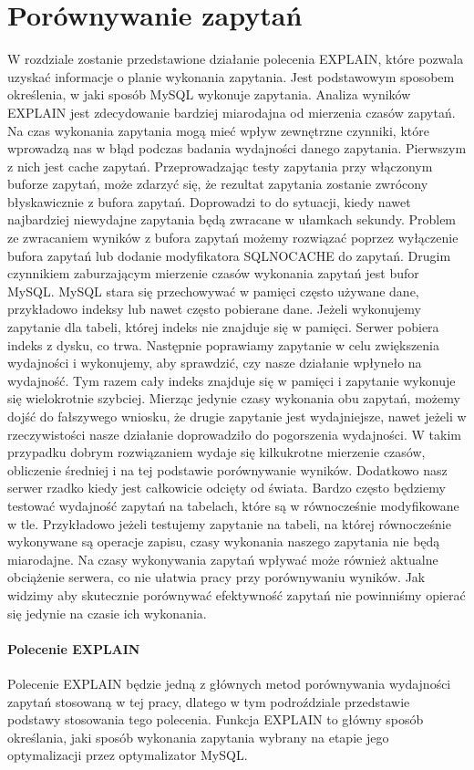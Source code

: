 \section{Porównywanie zapytań}
W rozdziale zostanie przedstawione działanie polecenia EXPLAIN, które pozwala uzyskać informacje o planie wykonania zapytania. Jest podstawowym sposobem określenia, w jaki sposób MySQL wykonuje zapytania. Analiza wyników EXPLAIN jest zdecydowanie bardziej miarodajna od mierzenia czasów zapytań. Na czas wykonania zapytania mogą mieć wpływ zewnętrzne czynniki, które wprowadzą nas w błąd podczas badania wydajności danego zapytania. Pierwszym z nich jest cache zapytań. Przeprowadzając testy zapytania przy włączonym buforze zapytań, może zdarzyć się, że rezultat zapytania zostanie zwrócony błyskawicznie z bufora zapytań. Doprowadzi to do sytuacji, kiedy nawet najbardziej niewydajne zapytania będą zwracane w ułamkach sekundy.  Problem ze zwracaniem wyników z bufora zapytań możemy rozwiązać poprzez wyłączenie bufora zapytań lub dodanie modyfikatora SQL\textunderscore NO\textunderscore CACHE do zapytań. Drugim czynnikiem zaburzającym mierzenie czasów wykonania zapytań jest bufor MySQL. MySQL stara się przechowywać w pamięci często używane dane, przykładowo indeksy lub nawet często pobierane dane. Jeżeli wykonujemy zapytanie dla tabeli, której indeks nie znajduje się w pamięci. Serwer pobiera indeks z dysku, co trwa. Następnie poprawiamy zapytanie w celu zwiększenia wydajności i wykonujemy, aby sprawdzić, czy nasze działanie wpłyneło na wydajność. Tym razem cały indeks znajduje się w pamięci i zapytanie wykonuje się wielokrotnie szybciej. Mierząc jedynie czasy wykonania obu zapytań, możemy dojść do fałszywego wniosku, że drugie zapytanie jest wydajniejsze, nawet jeżeli w rzeczywistości nasze działanie doprowadziło do pogorszenia wydajności. W takim przypadku dobrym rozwiązaniem wydaje się kilkukrotne mierzenie czasów, obliczenie średniej i na tej podstawie porównywanie wyników. Dodatkowo nasz serwer rzadko kiedy jest całkowicie odcięty od świata. Bardzo często będziemy testować wydajność zapytań na tabelach, które są w równocześnie modyfikowane w tle. Przykładowo jeżeli testujemy zapytanie na tabeli, na której równocześnie wykonywane są operacje zapisu, czasy wykonania naszego zapytania nie będą miarodajne. Na czasy wykonywania zapytań wpływać może również aktualne obciążenie serwera, co nie ułatwia pracy przy porównywaniu wyników. Jak widzimy aby skutecznie porównywać efektywność zapytań nie powinniśmy opierać się jedynie na czasie ich wykonania.
\paragraph{Polecenie EXPLAIN}
Polecenie EXPLAIN będzie jedną z głównych metod porównywania wydajności zapytań stosowaną w tej pracy, dlatego w tym podroździale przedstawie podstawy stosowania tego polecenia. Funkcja EXPLAIN to główny sposób określania, jaki sposób wykonania zapytania wybrany na etapie jego optymalizacji przez optymalizator MySQL.

